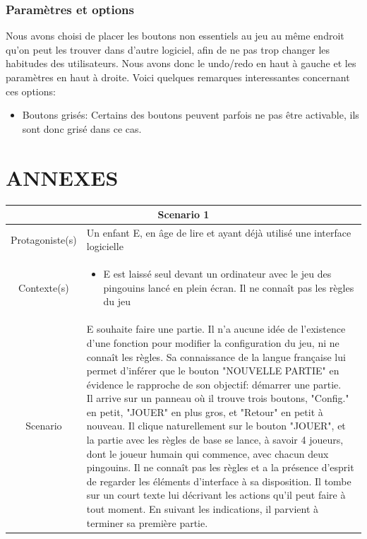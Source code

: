 \documentclass{report}
\begin{document}
\section{Paramètres et options}
Nous avons choisi de placer les boutons non essentiels au jeu au même endroit qu'on peut les trouver dans d'autre logiciel, afin de ne pas trop changer les habitudes des utilisateurs. Nous avons donc le undo/redo en haut à gauche et les paramètres en haut à droite. Voici quelques remarques interessantes concernant ces options:

\begin{itemize}
\item Boutons grisés: Certains des boutons peuvent parfois ne pas être activable, ils sont donc grisé dans ce cas.
\end{itemize}

\part*{ANNEXES}

\begin{tabular}{|c|l|}
 \hline
 \multicolumn{2}{|c|}{Scenario 1}\\
 \hline
 Protagoniste(s) & Un enfant E, en âge de lire et ayant déjà utilisé une interface logicielle \\
 \hline
 Contexte(s) & \parbox{13cm} {\begin{itemize}
 	\item E est laissé seul devant un ordinateur avec le jeu des pingouins lancé en plein écran. Il ne connaît pas les règles du jeu
\end{itemize} }\\
 \hline
 Scenario & \parbox{13cm}{ E souhaite faire une partie. Il n'a aucune idée de l'existence d'une fonction pour modifier la configuration du jeu, ni ne connaît les règles. Sa connaissance de la langue française lui permet d'inférer que le bouton "NOUVELLE PARTIE" en évidence le rapproche de son objectif: démarrer une partie. \\
 Il arrive sur un panneau où il trouve trois boutons, "Config." en petit, "JOUER" en plus gros, et "Retour" en petit à nouveau. Il clique naturellement sur le bouton "JOUER", et la partie avec les règles de base se lance, à savoir 4 joueurs, dont le joueur humain qui commence, avec chacun deux pingouins. Il ne connaît pas les règles et a la présence d'esprit de regarder les éléments d'interface à sa disposition. Il tombe sur un court texte lui décrivant les actions qu'il peut faire à tout moment. En suivant les indications, il parvient à terminer sa première partie.} \\
 \hline
 \end{tabular}
\end{document}
